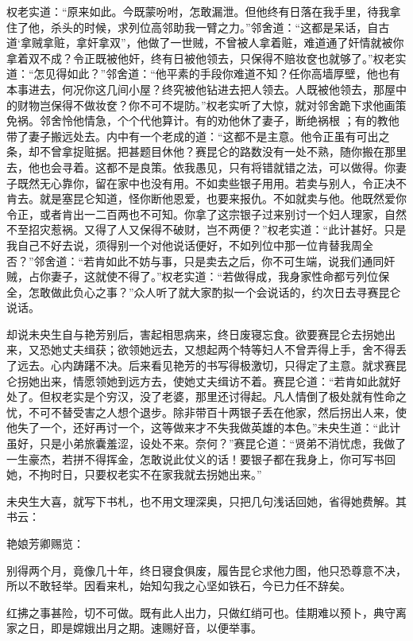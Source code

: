 \documentclass[a4paper,12pt,UTF8,twoside]{ctexbook}
\begin{document}
权老实道：“原来如此。今既蒙吩咐，怎敢漏泄。但他终有日落在我手里，待我拿住了他，杀头的时候，求列位高邻助我一臂之力。”邻舍道：“这都是呆话，自古道‘拿贼拿赃，拿奸拿双”，他做了一世贼，不曾被人拿着赃，难道通了奸情就被你拿着双不成？令正既被他奸，终有日被他领去，只保得不赔妆奁也就够了。”权老实道：“怎见得如此？”邻舍道：“他平素的手段你难道不知？任你高墙厚壁，他也有本事进去，何况你这几间小屋？终究被他钻进去把人领去。人既被他领去，那屋中的财物岂保得不做妆奁？你不可不堤防。”权老实听了大惊，就对邻舍跪下求他画策免祸。邻舍怜他情急，个个代他算计。有的劝他休了妻子，断绝祸根 ；有的教他带了妻子搬远处去。内中有一个老成的道：“这都不是主意。他令正虽有可出之条，却不曾拿捉赃据。把甚题目休他？赛昆仑的路数没有一处不熟，随你搬在那里去，他也会寻着。这都不是良策。依我愚见，只有将错就错之法，可以做得。你妻子既然无心靠你，留在家中也没有用。不如卖些银子用用。若卖与别人，令正决不肯去。就是塞昆仑知道，怪你断他恩爱，也要来报仇。不如就卖与他。他既然爱你令正，或者肯出一二百两也不可知。你拿了这宗银子过来别讨一个妇人理家，自然不至招灾惹祸。又得了人又保得不破财，岂不两便？”权老实道：“此计甚好。只是我自己不好去说，须得别一个对他说话便好，不如列位中那一位肯替我周全否？”邻舍道：“若肯如此不妨与事，只是卖去之后，你不可生端，说我们通同奸贼，占你妻子，这就使不得了。”权老实道：“若做得成，我身家性命都亏列位保全，怎敢做此负心之事？”众人听了就大家酌拟一个会说话的，约次日去寻赛昆仑说话。

却说未央生自与艳芳别后，害起相思病来，终日废寝忘食。欲要赛昆仑去拐她出来，又恐她丈夫缉获；欲领她远去，又想起两个特等妇人不曾弄得上手，舍不得丢了远去。心内踌躇不决。后来看见艳芳的书写得极激切，只得定了主意。就求赛昆仑拐她出来，情愿领她到远方去，使她丈夫缉访不着。赛昆仑道：“若肯如此就好处了。但权老实是个穷汉，没了老婆，那里还讨得起。凡人情倒了极处就有性命之忧，不可不替受害之人想个退步。除非带百十两银子丢在他家，然后拐出人来，使他失了一个，还好再讨一个，这等做来才不失我做英雄的本色。”未央生道：“此计虽好，只是小弟旅囊羞涩，设处不来。奈何？”赛昆仑道：“贤弟不消忧虑，我做了一生豪杰，若拼不得挥金，怎敢说此仗义的话！要银子都在我身上，你可写书回她，不拘时日，只要权老实不在家我就去拐她出来。”

未央生大喜，就写下书札，也不用文理深奥，只把几句浅话回她，省得她费解。其书云：

艳娘芳卿赐览：

别得两个月，竟像几十年，终日寝食俱废，履告昆仑求他力图，他只恐尊意不决，所以不敢轻举。因看来札，始知勾我之心坚如铁石，今已力任不辞矣。

红拂之事甚险，切不可做。既有此人出力，只做红绡可也。佳期难以预卜，典守离家之日，即是嫦娥出月之期。速赐好音，以便举事。
\end{document}

